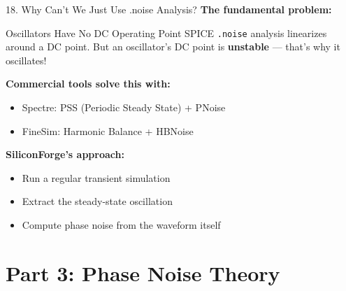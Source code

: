 \documentclass[aspectratio=169, 11pt]{beamer}
\begin{document}
\begin{frame}{18. Why Can't We Just Use .noise Analysis?}
    \textbf{The fundamental problem:}

    \vspace{0.5em}
    \begin{alertblock}{Oscillators Have No DC Operating Point}
        SPICE \texttt{.noise} analysis linearizes around a DC point. But an oscillator's DC point is \textbf{unstable} — that's why it oscillates!
    \end{alertblock}

    \vspace{0.5em}
    \textbf{Commercial tools solve this with:}
    \begin{itemize}
        \item Spectre: PSS (Periodic Steady State) + PNoise
        \item FineSim: Harmonic Balance + HBNoise
    \end{itemize}

    \vspace{0.5em}
    \textbf{SiliconForge's approach:}
    \begin{itemize}
        \item Run a regular transient simulation
        \item Extract the steady-state oscillation
        \item Compute phase noise from the waveform itself
    \end{itemize}
\end{frame}


\section{Part 3: Phase Noise Theory}
\end{document}
